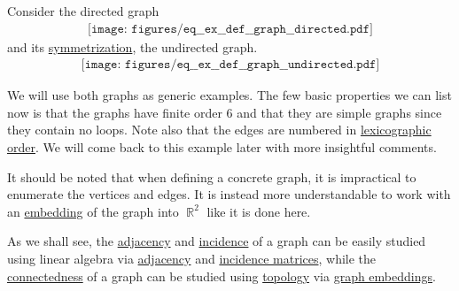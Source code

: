 \begin{example}\label{ex:def:graph}
  Consider the directed graph
  \begin{equation}\label{eq:ex:def:graph/directed}
    \begin{aligned}
      \texttt{[image: figures/eq\_\_ex\_\_def\_\_graph\_\_directed.pdf]}
    \end{aligned}
  \end{equation}
  and its \hyperref[def:graph/symmetrization]{symmetrization}, the undirected graph.
  \begin{equation}\label{eq:ex:def:graph/undirected}
    \begin{aligned}
      \texttt{[image: figures/eq\_\_ex\_\_def\_\_graph\_\_undirected.pdf]}
    \end{aligned}
  \end{equation}

  We will use both graphs as generic examples. The few basic properties we can list now is that the graphs have finite order \( 6 \) and that they are simple graphs since they contain no loops. Note also that the edges are numbered in \hyperref[eq:def:lexicographic_order]{lexicographic order}. We will come back to this example later with more insightful comments.

  It should be noted that when defining a concrete graph, it is impractical to enumerate the vertices and edges. It is instead more understandable to work with an \hyperref[def:graph_embedding]{embedding} of the graph into \( \BbbR^2 \) like it is done here.
\end{example}

\begin{remark}\label{rem:graphs_linear_algebra_and_topology}
  As we shall see, the \hyperref[def:graph]{adjacency} and \hyperref[def:graph_incidence]{incidence} of a graph can be easily studied using linear algebra via \hyperref[def:graph_matrices/adjacency]{adjacency} and \hyperref[def:graph_matrices/incidence]{incidence matrices}, while the \hyperref[def:graph_connectedness]{connectedness} of a graph can be studied using \hyperref[def:graph_connectedness]{topology} via \hyperref[def:graph_embedding]{graph embeddings}.
\end{remark}

